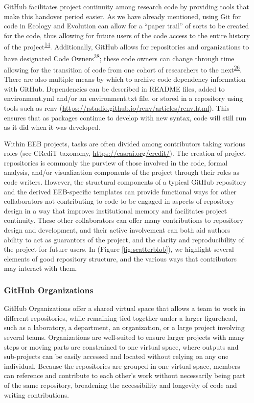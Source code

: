 GitHub facilitates project continuity among research code by providing tools that make this handover period easier.
As we have already mentioned, using Git for code in Ecology and Evolution can allow for a ``paper trail'' of sorts to be created for the code, thus allowing for future users of the code access to the entire history of the project\textsuperscript{\protect\hyperlink{ref-3DKwn1sY}{14}}.
Additionally, GitHub allows for repositories and organizations to have designated Code Owners\textsuperscript{\protect\hyperlink{ref-s91uGRZ2}{38}}; these code owners can change through time allowing for the transition of code from one cohort of researchers to the next\textsuperscript{\protect\hyperlink{ref-iIEKCTLU}{26}}.
There are also multiple means by which to archive code dependency information with GitHub.
Dependencies can be described in README files, added to environment.yml and/or an environment.txt file, or stored in a repository using tools such as renv (\url{https://rstudio.github.io/renv/articles/renv.html}).
This ensures that as packages continue to develop with new syntax, code will still run as it did when it was developed.

Within EEB projects, tasks are often divided among contributors taking various roles (see CRediT taxonomy, \url{https://casrai.org/credit/}).
The creation of project repositories is commonly the purview of those involved in the code, formal analysis, and/or visualization components of the project through their roles as code writers.
However, the structural components of a typical GitHub repository and the derived EEB-specific templates can provide functional ways for other collaborators not contributing to code to be engaged in aspects of repository design in a way that improves institutional memory and facilitates project continuity.
These other collaborators can offer many contributions to repository design and development, and their active involvement can both aid authors ability to act as guarantors of the project, and the clarity and reproducibility of the project for future users.
In (Figure \ref{fig:scatterblob}), we highlight several elements of good repository structure, and the various ways that contributors may interact with them.

\hypertarget{github-organizations}{%
\subsubsection{GitHub Organizations}\label{github-organizations}}

GitHub Organizations offer a shared virtual space that allows a team to work in different repositories, while remaining tied together under a larger figurehead, such as a laboratory, a department, an organization, or a large project involving several teams.
Organizations are well-suited to ensure larger projects with many steps or moving parts are constrained to one virtual space, where outputs and sub-projects can be easily accessed and located without relying on any one individual.
Because the repositories are grouped in one virtual space, members can reference and contribute to each other's work without necessarily being part of the same repository, broadening the accessibility and longevity of code and writing contributions.

